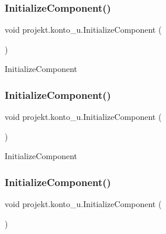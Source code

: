 \subsubsection{\texorpdfstring{Initialize\+Component()}{InitializeComponent()}\hspace{0.1cm}{\footnotesize\ttfamily [5/9]}}
{\footnotesize\ttfamily void projekt.\+konto\+\_\+u.\+Initialize\+Component (\begin{DoxyParamCaption}{ }\end{DoxyParamCaption})\hspace{0.3cm}{\ttfamily [inline]}}



Initialize\+Component 

\mbox{\label{classprojekt_1_1konto__u_aba94445ce67074714f9c38935885c165}} 
\subsubsection{\texorpdfstring{Initialize\+Component()}{InitializeComponent()}\hspace{0.1cm}{\footnotesize\ttfamily [6/9]}}
{\footnotesize\ttfamily void projekt.\+konto\+\_\+u.\+Initialize\+Component (\begin{DoxyParamCaption}{ }\end{DoxyParamCaption})\hspace{0.3cm}{\ttfamily [inline]}}



Initialize\+Component 

\mbox{\label{classprojekt_1_1konto__u_aba94445ce67074714f9c38935885c165}} 
\subsubsection{\texorpdfstring{Initialize\+Component()}{InitializeComponent()}\hspace{0.1cm}{\footnotesize\ttfamily [7/9]}}
{\footnotesize\ttfamily void projekt.\+konto\+\_\+u.\+Initialize\+Component (\begin{DoxyParamCaption}{ }\end{DoxyParamCaption})\hspace{0.3cm}{\ttfamily [inline]}}



